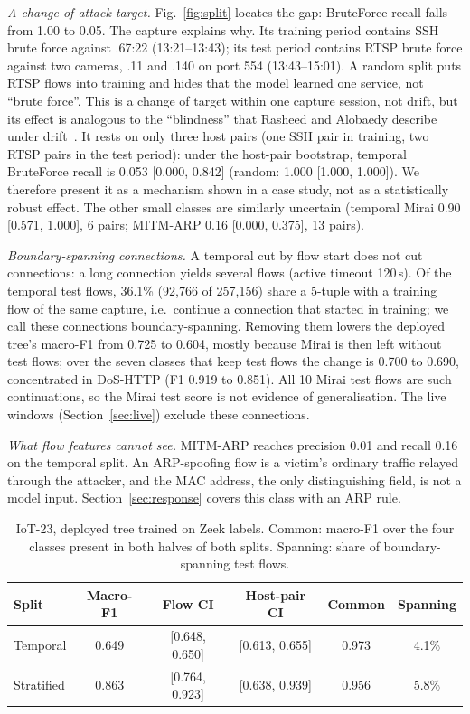\emph{A change of attack target.} Fig.~\ref{fig:split} locates the gap: BruteForce recall falls from 1.00 to 0.05. The capture explains why. Its training period contains SSH brute force against .67:22 (13:21--13:43); its test period contains RTSP brute force against two cameras, .11 and .140 on port 554 (13:43--15:01). A random split puts RTSP flows into training and hides that the model learned one service, not ``brute force''. This is a change of target within one capture session, not drift, but its effect is analogous to the ``blindness'' that Rasheed and Alobaedy describe under drift~\cite{rasheed2026drift}. It rests on only three host pairs (one SSH pair in training, two RTSP pairs in the test period): under the host-pair bootstrap, temporal BruteForce recall is 0.053 [0.000, 0.842] (random: 1.000 [1.000, 1.000]). We therefore present it as a mechanism shown in a case study, not as a statistically robust effect. The other small classes are similarly uncertain (temporal Mirai 0.90 [0.571, 1.000], 6 pairs; MITM-ARP 0.16 [0.000, 0.375], 13 pairs).

\emph{Boundary-spanning connections.} A temporal cut by flow start does not cut connections: a long connection yields several flows (active timeout 120\,s). Of the temporal test flows, 36.1\% (92,766 of 257,156) share a 5-tuple with a training flow of the same capture, i.e.\ continue a connection that started in training; we call these connections boundary-spanning. Removing them lowers the deployed tree's macro-F1 from 0.725 to 0.604, mostly because Mirai is then left without test flows; over the seven classes that keep test flows the change is 0.700 to 0.690, concentrated in DoS-HTTP (F1 0.919 to 0.851). All 10 Mirai test flows are such continuations, so the Mirai test score is not evidence of generalisation. The live windows (Section~\ref{sec:live}) exclude these connections.

\emph{What flow features cannot see.} MITM-ARP reaches precision 0.01 and recall 0.16 on the temporal split. An ARP-spoofing flow is a victim's ordinary traffic relayed through the attacker, and the MAC address, the only distinguishing field, is not a model input. Section~\ref{sec:response} covers this class with an ARP rule.

\begin{table}[t]
\centering
\caption{IoT-23, deployed tree trained on Zeek labels. Common: macro-F1 over the four classes present in both halves of both splits. Spanning: share of boundary-spanning test flows.}
\label{tab:iot23split}
\footnotesize
\setlength{\tabcolsep}{2.5pt}
\begin{tabular}{lccccc}
\hline
Split & Macro-F1 & Flow CI & Host-pair CI & Common & Spanning \\
\hline
Temporal   & 0.649 & [0.648, 0.650] & [0.613, 0.655] & 0.973 & 4.1\% \\
Stratified & 0.863 & [0.764, 0.923] & [0.638, 0.939] & 0.956 & 5.8\% \\
\hline
\end{tabular}
\end{table}

